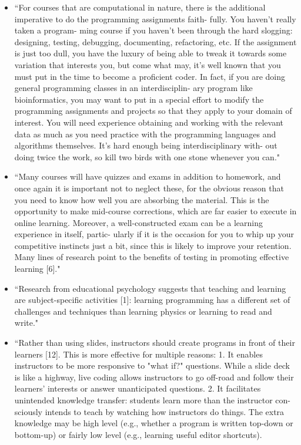 \documentclass[pdftex,english,11pt,parskip=half]{scrartcl}
\begin{document}
\begin{itemize}
\item ``For courses that are computational in nature, there is the additional imperative to do the programming assignments faith- fully. You haven’t really taken a program- ming course if you haven’t been through the hard slogging: designing, testing, debugging, documenting, refactoring, etc. If the assignment is just too dull, you have the luxury of being able to tweak it towards some variation that interests you, but come what may, it’s well known that you must put in the time to become a proficient coder. In fact, if you are doing general programming classes in an interdisciplin- ary program like bioinformatics, you may want to put in a special effort to modify the programming assignments and projects so that they apply to your domain of interest. You will need experience obtaining and working with the relevant data as much as you need practice with the programming languages and algorithms themselves. It’s hard enough being interdisciplinary with- out doing twice the work, so kill two birds with one stone whenever you can." \cite{searls2012ten}
\item ``Many courses will have quizzes and exams in addition to homework, and once again it is important not to neglect these, for the obvious reason that you need to know how well you are absorbing the material. This is the opportunity to make mid-course corrections, which are far easier to execute in online learning. Moreover, a well-constructed exam can be a learning experience in itself, partic- ularly if it is the occasion for you to whip up your competitive instincts just a bit, since this is likely to improve your retention. Many lines of research point to the benefits of testing in promoting effective learning [6]." \cite{searls2012ten}
\item ``Research from educational psychology suggests that teaching and learning are subject-specific activities [1]: learning programming has a different set of challenges and techniques than learning physics or learning to read and write." \cite{brown2018ten}
\item ``Rather than using slides, instructors should create programs in front of their learners [12]. This is more effective for multiple reasons:
1. It enables instructors to be more responsive to "what if?" questions. While a slide deck is like a highway, live coding allows instructors to go off-road and follow their learners’ interests or answer unanticipated questions.
2. It facilitates unintended knowledge transfer: students learn more than the instructor con- sciously intends to teach by watching how instructors do things. The extra knowledge may be high level (e.g., whether a program is written top-down or bottom-up) or fairly low level (e.g., learning useful editor shortcuts).

\end{itemize}
\end{document}
